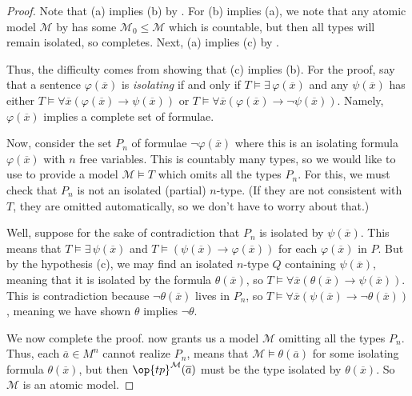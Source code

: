 \documentclass[../notes.tex]{subfiles}
\begin{document}
\begin{proof}
	Note that (a) implies (b) by . For (b) implies (a), we note that any atomic model $\mathcal M$ by  has some $\mathcal M_0\le\mathcal M$ which is countable, but then all types will remain isolated, so  completes. Next, (a) implies (c) by .

	Thus, the difficulty comes from showing that (c) implies (b). For the proof, say that a sentence $\varphi(\overline x)$ is \textit{isolating} if and only if $T\models\exists\,\varphi(\overline x)$ and any $\psi(\overline x)$ has either $T\models\forall\overline x(\varphi(\overline x)\to\psi(\overline x))$ or $T\models\forall\overline x(\varphi(\overline x)\to\lnot\psi(\overline x))$. Namely, $\varphi(\overline x)$ implies a complete set of formulae.

	Now, consider the set $P_n$ of formulae $\lnot\varphi(\overline x)$ where this is an isolating formula $\varphi(\overline x)$ with $n$ free variables. This is countably many types, so we would like to use  to provide a model $\mathcal M\models T$ which omits all the types $P_n$. For this, we must check that $P_n$ is not an isolated (partial) $n$-type. (If they are not consistent with $T$, they are omitted automatically, so we don't have to worry about that.)
	
	Well, suppose for the sake of contradiction that $P_n$ is isolated by $\psi(\overline x)$. This means that $T\models\exists\,\psi(\overline x)$ and $T\models(\psi(\overline x)\to\varphi(\overline x))$ for each $\varphi(\overline x)$ in $P$. But by the hypothesis (c), we may find an isolated $n$-type $Q$ containing $\psi(\overline x)$, meaning that it is isolated by the formula $\theta(\overline x)$, so $T\models\forall\overline x(\theta(\overline x)\to\psi(\overline x))$. This is contradiction because $\lnot\theta(\overline x)$ lives in $P_n$, so $T\models\forall\overline x(\psi(\overline x)\to\lnot\theta(\overline x))$, meaning we have shown $\theta$ implies $\lnot\theta$.

	We now complete the proof.  now grants us a model $\mathcal M$ omitting all the types $P_n$. Thus, each $\overline a\in M^n$ cannot realize $P_n$, means that $\mathcal M\models\theta(\overline a)$ for some isolating formula $\theta(\overline x)$, but then $\op{tp}^{\mathcal M}(\overline a)$ must be the type isolated by $\theta(\overline x)$. So $\mathcal M$ is an atomic model.
\end{proof}
\end{document}
